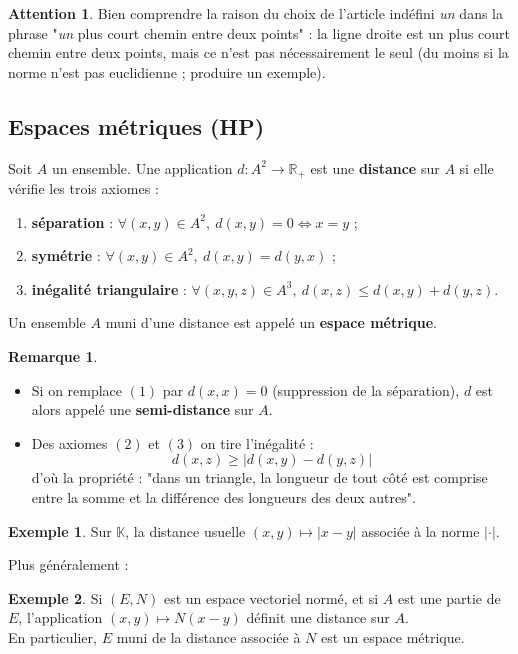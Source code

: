 \documentclass[french]{article}
\newcommand{\R}{\mathbb{R}}
\newcommand{\K}{\mathbb{K}}
\theoremstyle{plain}
\theoremstyle{definition}
\newtheorem*{ex}{Exemple}
\newtheorem*{rmq}{Remarque}
\newtheorem*{attention}{Attention}
\theoremstyle{remark}
\begin{document}
\begin{attention} 
	Bien comprendre la raison du choix de l'article indéfini \textit{un} dans la phrase "\textit{un} plus court chemin entre deux points" : la ligne droite est un plus court chemin entre deux points, mais ce n'est pas nécessairement le seul (du moins si la norme n'est pas euclidienne ; produire un exemple).
\end{attention}

\subsection{Espaces métriques (HP)}

\begin{dfn}
	Soit $A$ un ensemble. Une application $d:A^2\to\R_+$ est une \textbf{distance} sur $A$ si elle vérifie les trois axiomes :
	\begin{enumerate}[label=(\arabic*)]
		\item \textbf{séparation} : $\forall (x,y)\in A^2,\ d(x,y)=0\iff x=y$ ;
		\item \textbf{symétrie} : $\forall(x,y)\in A^2,\ d(x,y)=d(y,x)$ ;
		\item \textbf{inégalité triangulaire} : $\forall (x,y,z)\in A^3,\ d(x,z)\leqslant d(x,y)+d(y,z)$.
	\end{enumerate}
	Un ensemble $A$ muni d'une distance est appelé un \textbf{espace métrique}.
\end{dfn}

\begin{rmq}
	\begin{itemize}
		\item Si on remplace $(1)$ par $d(x,x)=0$ (suppression de la séparation), $d$ est alors appelé une \textbf{semi-distance} sur $A$.
		\item Des axiomes $(2)$ et $(3)$ on tire l'inégalité : $$d(x,z)\geqslant\lvert d(x,y)-d(y,z)\rvert$$ d'où la propriété : "dans un triangle, la longueur de tout côté est comprise entre la somme et la différence des longueurs des deux autres".
	\end{itemize}
\end{rmq}

\begin{ex}
	Sur $\K$, la distance usuelle $(x,y)\mapsto\lvert x-y\rvert$ associée à la norme $\lvert\cdot\rvert$.
\end{ex}

Plus généralement :

\begin{ex}%
	Si $(E,N)$ est un espace vectoriel normé, et si $A$ est une partie de $E$, l'application $(x,y)\mapsto N(x-y)$ définit une distance sur $A$. \\
	En particulier, $E$ muni de la distance associée à $N$ est un espace métrique.
\end{ex}
\end{document}

